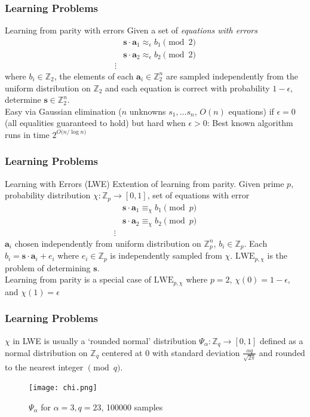 \documentclass{beamer}
\renewcommand{\v}{\mathbf}
\begin{document}
\begin{frame}
    \frametitle{Learning Problems}
    \begin{block}{Learning from parity with errors}
        Given a set of \textit{equations with errors}
    \begin{align*}
        &\v{s}\cdot \v{a}_1 \approx_\epsilon b_1 \pmod{2} \\
        &\v{s}\cdot \v{a}_2 \approx_\epsilon b_2 \pmod{2} \\
        \vdots
    \end{align*}
    where $b_i \in \mathbb{Z}_2$, the elements of each $\v{a}_i \in \mathbb{Z}^n_2$
    are sampled independently from the uniform distribution on $\mathbb{Z}_2$
    and each equation is correct with probability $1-\epsilon$,
    determine $\v{s} \in \mathbb{Z}^n_2$.
    \bigskip \\
    Easy via Gaussian elimination ($n$ unknowns $s_1,\ldots s_n$, $O(n)$ equations) 
    if $\epsilon = 0$ (all equalities guaranteed to hold) but hard
    when $\epsilon > 0$: Best known algorithm runs in time $2^{O(n/\log{n)}}$
    \end{block}
\end{frame}

\begin{frame}
\frametitle{Learning Problems}
\begin{block}{Learning with Errors (LWE)}
    Extention of learning from parity. Given prime $p$, probability distribution 
    $\chi: \mathbb{Z}_p \to [0,1]$, set of equations with error
    \begin{align*}
        &\v{s} \cdot \v{a}_1 \equiv_\chi b_1 \pmod{p} \\
        &\v{s} \cdot \v{a}_2 \equiv_\chi b_2 \pmod{p} \\
        \vdots
    \end{align*}
    $\v{a}_i$ chosen independently from uniform distribution on $\mathbb{Z}_p^n$, $b_i \in \mathbb{Z}_p$. Each $b_i = \v{s}\cdot\v{a}_i + e_i$
    where $e_i \in \mathbb{Z}_p$ is independently sampled from $\chi$.
    $\text{LWE}_{p,\chi}$ is the problem of determining $\v{s}$.
    \bigskip \\
    Learning from parity is a special case of $\text{LWE}_{p,\chi}$
    where $p=2$, $\chi(0) = 1-\epsilon$, and $\chi(1) = \epsilon$
\end{block}
\end{frame}
    
\begin{frame}
\frametitle{Learning Problems}
$\chi$ in LWE is usually a `rounded normal' distribution
$\Psi_\alpha: \mathbb{Z}_q \to [0,1]$ defined as a normal
distribution on $\mathbb{Z}_q$ centered at 0 with standard
deviation $\frac{\alpha q}{\sqrt{2\pi}}$ and rounded to the
nearest integer $\pmod{q}$.
\begin{figure}[h!]
    \caption{$\Psi_\alpha$ for $\alpha=3, q=23$, 100000 samples}
    \centering
    \texttt{[image: chi.png]}
\end{figure}
\end{frame}
\end{document}
